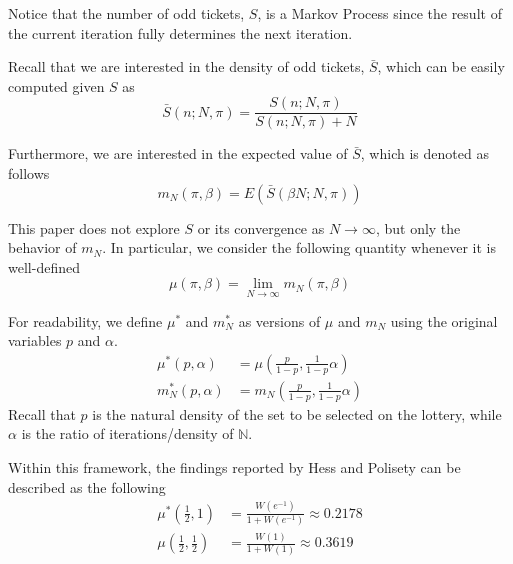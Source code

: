 \documentclass{article}
\newcommand{\N}{\mathbb{N}}
\newcommand{\ppar}[1]{\left( #1 \right)}
\begin{document}
Notice that the number of odd tickets, $S$, is a Markov Process since the result of the current iteration fully determines the next iteration.

Recall that we are interested in the density of odd tickets, $\bar{S}$, which can be easily computed given $S$ as
\begin{equation}
    \bar{S}\ppar{n; N, \pi} =
    \frac{S\ppar{n; N, \pi}}{S\ppar{n; N, \pi} + N}
\end{equation}

Furthermore, we are interested in the expected value of $\bar{S}$, which is denoted as follows
\begin{equation}
    m_N\ppar{\pi, \beta} = E\ppar{\bar{S}\ppar{\beta N; N, \pi }}
\end{equation}

This paper does not explore $S$ or its convergence as $N \rightarrow \infty$, but only the behavior of $m_N$. 
%
In particular, we consider the following quantity whenever it is well-defined
\begin{equation}
    \mu\ppar{\pi, \beta} = \lim_{N\rightarrow \infty} m_N\ppar{\pi, \beta}
\end{equation}

For readability, we define $\mu^*$ and $m_N^*$ as versions of $\mu$ and $m_N$ using the original variables $p$ and $\alpha$. 
\begin{align}
    \mu^*\ppar{p, \alpha} &= \mu\ppar{\frac{p}{1-p}, \frac{1}{1-p} \alpha}
    \\
    m_N^*\ppar{p, \alpha} &= m_N\ppar{\frac{p}{1-p}, \frac{1}{1-p} \alpha}
\end{align}
Recall that $p$ is the natural density of the set to be selected on the lottery, while $\alpha$ is the ratio of iterations/density of $\N$.


Within this framework,
the findings reported by Hess and Polisety \cite{hess2023} can be described as the following
\begin{align}
\mu^*\ppar{\frac{1}{2}, 1}
    &=
    \frac{W\ppar{e^{-1}}}{1+W\ppar{e^{-1}}} \approx 0.2178
    \\
\mu\ppar{\frac{1}{2}, \frac{1}{2}}
    &=
    \frac{W\ppar{1}}{1+W\ppar{1}} \approx 0.3619
\end{align}

\end{document}
